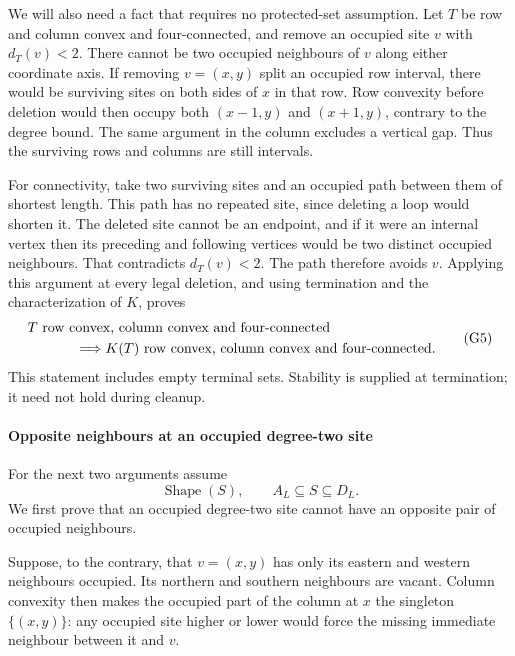 \documentclass[
  11pt,
  a4paper,
]{article}
\begin{document}
We will also need a fact that requires no protected-set assumption. Let
\(T\) be row and column convex and four-connected, and remove an
occupied site \(v\) with \(d_T(v)<2\). There cannot be two occupied
neighbours of \(v\) along either coordinate axis. If removing
\(v=(x,y)\) split an occupied row interval, there would be surviving
sites on both sides of \(x\) in that row. Row convexity before deletion
would then occupy both \((x-1,y)\) and \((x+1,y)\), contrary to the
degree bound. The same argument in the column excludes a vertical gap.
Thus the surviving rows and columns are still intervals.

For connectivity, take two surviving sites and an occupied path between
them of shortest length. This path has no repeated site, since deleting
a loop would shorten it. The deleted site cannot be an endpoint, and if
it were an internal vertex then its preceding and following vertices
would be two distinct occupied neighbours. That contradicts
\(d_T(v)<2\). The path therefore avoids \(v\). Applying this argument at
every legal deletion, and using termination and the characterization of
\(K\), proves \[
\begin{aligned}
&T\text{ row convex, column convex and four-connected}\\
&\hspace{12mm}\Longrightarrow
K(T)\text{ row convex, column convex and four-connected}.
\end{aligned}
\tag{G5}
\] This statement includes empty terminal sets. Stability is supplied at
termination; it need not hold during cleanup.

\paragraph{Opposite neighbours at an occupied degree-two
site}\label{opposite-neighbours-at-an-occupied-degree-two-site}

For the next two arguments assume \[
\operatorname{Shape}(S),\qquad A_L\subseteq S\subseteq D_L.
\] We first prove that an occupied degree-two site cannot have an
opposite pair of occupied neighbours.

Suppose, to the contrary, that \(v=(x,y)\) has only its eastern and
western neighbours occupied. Its northern and southern neighbours are
vacant. Column convexity then makes the occupied part of the column at
\(x\) the singleton \(\{(x,y)\}\): any occupied site higher or lower
would force the missing immediate neighbour between it and \(v\).
\end{document}

